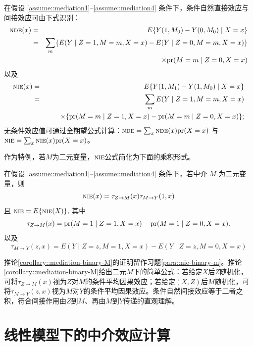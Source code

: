 \begin{corollary}
\label{corollary::mediation-nde-nie}
在假设 \ref{assume::mediation1}--\ref{assume::mediation4} 条件下，条件自然直接效应与间接效应可由下式识别：
\begin{eqnarray*}
\textsc{nde}(x) &=& E\{ Y(1, M_0) - Y(0, M_0) \mid X=x \} \\
&=& \sum_m \{ E( Y  \mid  Z=1, M=m,   X=x) - E( Y  \mid  Z=0, M=m,   X=x) \} \\
&& \qquad  \times \textup{pr}(M=m \mid Z=0, X=x)
\end{eqnarray*}
以及
\begin{eqnarray*}
\textsc{nie}(x) &=& E\{ Y(1, M_1) - Y(1, M_0) \mid X=x \} \\
&=& \sum_m   E( Y  \mid  Z=1, M=m,   X=x)\\
&&  \qquad  \times  \{ \textup{pr}(M=m \mid Z=1, X=x) -  \textup{pr}(M=m \mid Z=0, X=x) \};
\end{eqnarray*}
无条件效应值可通过全期望公式计算：$\textsc{nde} = \sum_ x \textsc{nde}(x) \textup{pr}(X=x)$ 与 $\textsc{nie} = \sum_ x \textsc{nie}(x) \textup{pr}(X=x)$。
\end{corollary}





作为特例，若$M$为二元变量，$\textsc{nie}$公式简化为下面的乘积形式。


\begin{corollary}
\label{corollary::mediation-binary-M}
在假设 \ref{assume::mediation1}--\ref{assume::mediation4} 条件下，若中介 $M$ 为二元变量，则
$$
\textsc{nie}(x)  =      \tau_{Z\rightarrow M} (x) \tau_{M\rightarrow Y} (1,x)
$$
且
$
\textsc{nie} = E\{  \textsc{nie}(X)   \},
$
其中
$$
\tau_{Z\rightarrow M}(x) =  \textup{pr}(M=1 \mid Z=1, X=x) -  \textup{pr}(M=1 \mid Z=0, X=x) . 
$$
以及
$$
\tau_{M\rightarrow Y} (z,x) = E( Y  \mid  Z=z, M=1,   X=x) - E( Y  \mid  Z=z, M=0,   X=x)
$$
\end{corollary}

推论\ref{corollary::mediation-binary-M}的证明留作习题\ref{para::nie-binary-m}。推论\ref{corollary::mediation-binary-M}给出二元$M$下的简单公式：若给定$X$后$Z$随机化，可将$\tau_{Z\rightarrow M}(x) $视为$Z$对$M$的条件平均因果效应；若给定$(X,Z)$后$M$随机化，可将$\tau_{M\rightarrow Y} (z,x) $视为$M$对$Y$的条件平均因果效应。条件自然间接效应等于二者之积，符合间接作用由$Z$到$M$、再由$M$到$Y$传递的直观理解。 


\section{线性模型下的中介效应计算}


